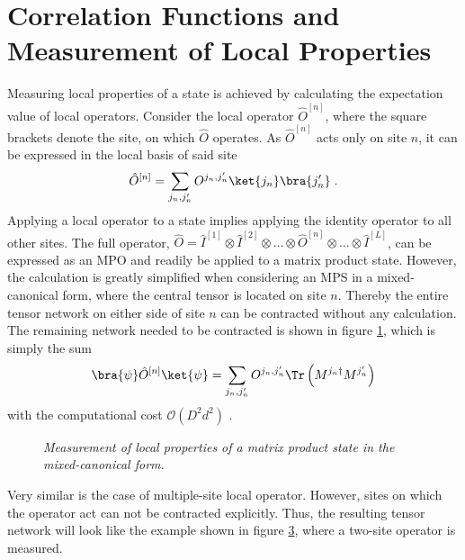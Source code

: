 \section{Correlation Functions and Measurement of Local Properties}
\label{sec:correlationFunctions}
Measuring local properties of a state is achieved by calculating the expectation value of local operators. Consider the local operator $\hat{O}^{[n]}$, where the square brackets denote the site, on which $\hat{O}$ operates. As $\hat{O}^{[n]}$ acts only on site $n$, it can be expressed in the local basis of said site
\begin{equation}
	\hat{O}^{[n]} = \sum_{j_n , j_n '} O^{j_n , j_n '} \ket{j_n} \bra{j_n '} \; .
	\label{eq:localOperator}
\end{equation}
Applying a local operator to a state implies applying the identity operator to all other sites. The full operator, $\hat{O} = \hat{I}^{[1]} \otimes \hat{I}^{[2]} \otimes \ldots \otimes \hat{O}^{[n]} \otimes \ldots \otimes \hat{I}^{[L]}$, can be expressed as an MPO and readily be applied to a matrix product state. However, the calculation is greatly simplified when considering an MPS in a mixed-canonical form, where the central tensor is located on site $n$. Thereby the entire tensor network on either side of site $n$ can be contracted without any calculation. The remaining network needed to be contracted is shown in figure \ref{fig:SingleSiteOperator}, which is simply the sum
\begin{equation}
	\bra{\psi} \hat{O}^{[n]} \ket{\psi} = \sum_{j_n , j_n '} O^{j_n , j_n '} \Tr \left( M^{j_n \dag} M^{j_n '} \right) 
\end{equation}
with the computational cost $\mathcal{O}(D^2 d^2)$ \cite{schollwock}.
\begin{figure}[h!]
\centering %
\begin{subfigure}[b]{0.35\textwidth}
	\caption{}
  	
	\label{fig:SingleSiteOperator}
\end{subfigure}
\begin{subfigure}[b]{0.35\textwidth}
	\caption{}    
  	
	\label{fig:DoubleSiteOperator}
\end{subfigure}
\caption{\textit{Measurement of local properties of a matrix product state in the mixed-canonical form.}}
\end{figure}
Very similar is the case of multiple-site local operator. However, sites on which the operator act can not be contracted explicitly. Thus, the resulting tensor network will look like the example shown in figure \ref{fig:DoubleSiteOperator}, where a two-site operator is measured.\\

